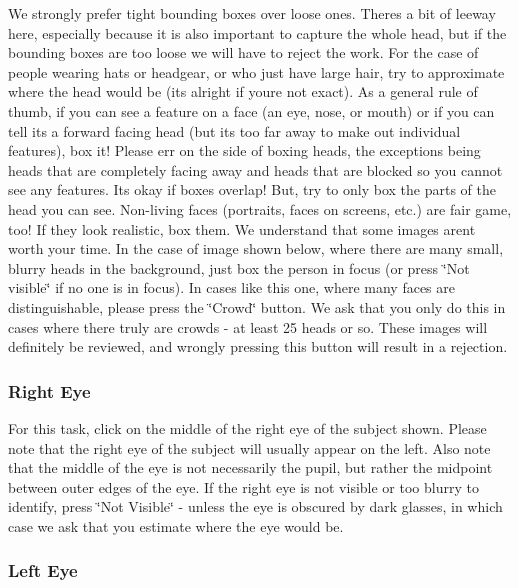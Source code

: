 We strongly prefer tight bounding boxes over loose ones. There\textquotesingle{}s a bit of leeway here, especially because it is also important to capture the whole head, but if the bounding boxes are too loose we will have to reject the work. For the case of people wearing hats or headgear, or who just have large hair, try to approximate where the head would be (it\textquotesingle{}s alright if you\textquotesingle{}re not exact). As a general rule of thumb, if you can see a feature on a face (an eye, nose, or mouth) or if you can tell it\textquotesingle{}s a forward facing head (but it\textquotesingle{}s too far away to make out individual features), box it! Please err on the side of boxing heads, the exceptions being heads that are completely facing away and heads that are blocked so you cannot see any features. It\textquotesingle{}s okay if boxes overlap! But, try to only box the parts of the head you can see. Non-\/living faces (portraits, faces on screens, etc.) are fair game, too! If they look realistic, box them. We understand that some images aren\textquotesingle{}t worth your time. In the case of image shown below, where there are many small, blurry heads in the background, just box the person in focus (or press \char`\"{}\+Not visible\char`\"{} if no one is in focus). In cases like this one, where many faces are distinguishable, please press the \char`\"{}\+Crowd\char`\"{} button. We ask that you only do this in cases where there truly are crowds -\/ at least 25 heads or so. These images will definitely be reviewed, and wrongly pressing this button will result in a rejection.\hypertarget{group__janus_right_eye}{}\subsubsection{Right Eye}\label{group__janus_right_eye}
For this task, click on the middle of the right eye of the subject shown. Please note that the right eye of the subject will usually appear on the left. Also note that the middle of the eye is not necessarily the pupil, but rather the midpoint between outer edges of the eye. If the right eye is not visible or too blurry to identify, press \char`\"{}\+Not Visible\char`\"{} -\/ unless the eye is obscured by dark glasses, in which case we ask that you estimate where the eye would be.\hypertarget{group__janus_left_eye}{}\subsubsection{Left Eye}\label{group__janus_left_eye}
